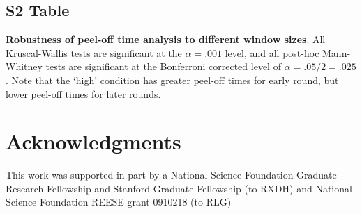\documentclass[10pt,letterpaper]{article}
\begin{document}
\subsection*{S2 Table}
\label{S2_Table}
{\bf Robustness of peel-off time analysis to different window sizes}. All Kruscal-Wallis tests are significant at the $\alpha = .001$ level, and all post-hoc Mann-Whitney tests are significant at the Bonferroni corrected level of $\alpha = .05/2 = .025$. Note that the `high' condition has greater peel-off times for early round, but lower peel-off times for later rounds.
 
\section*{Acknowledgments}
This work was supported in part by a National Science Foundation Graduate Research Fellowship and Stanford Graduate Fellowship (to RXDH) and National Science Foundation REESE grant 0910218 (to RLG)

\nolinenumbers


%
%
% 
\end{document}
